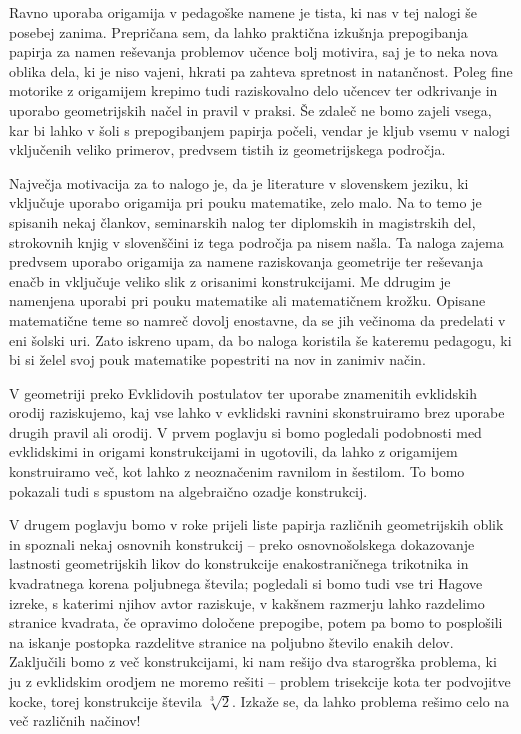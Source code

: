 Ravno uporaba origamija v pedagoške namene je tista, ki nas v tej nalogi še posebej zanima. Prepričana sem, da lahko praktična izkušnja prepogibanja papirja za namen reševanja problemov učence bolj motivira, saj je to neka nova oblika dela, ki je niso vajeni, hkrati pa zahteva spretnost in natančnost. Poleg fine motorike z origamijem krepimo tudi raziskovalno delo učencev ter odkrivanje in uporabo geometrijskih načel in pravil v praksi. Še zdaleč ne bomo zajeli vsega, kar bi lahko v šoli s prepogibanjem papirja počeli, vendar je kljub vsemu v nalogi vključenih veliko primerov, predvsem tistih iz geometrijskega področja.

Največja motivacija za to nalogo je, da je literature v slovenskem jeziku, ki vključuje uporabo origamija pri pouku matematike, zelo malo. Na to temo je spisanih nekaj člankov, seminarskih nalog ter diplomskih in magistrskih del, strokovnih knjig v slovenščini iz tega področja pa nisem našla. Ta naloga zajema predvsem uporabo origamija za namene raziskovanja geometrije ter reševanja enačb in vključuje veliko slik z orisanimi konstrukcijami. Me ddrugim je namenjena uporabi pri pouku matematike ali matematičnem krožku. Opisane matematične teme so namreč dovolj enostavne, da se jih večinoma da predelati v eni šolski uri. Zato iskreno upam, da bo naloga koristila še kateremu pedagogu, ki bi si želel svoj pouk matematike popestriti na nov in zanimiv način.

V geometriji preko Evklidovih postulatov ter uporabe znamenitih evklidskih orodij raziskujemo, kaj vse lahko v evklidski ravnini skonstruiramo brez uporabe drugih pravil ali orodij. V prvem poglavju si bomo pogledali podobnosti med evklidskimi in origami konstrukcijami in ugotovili, da lahko z origamijem konstruiramo več, kot lahko z neoznačenim ravnilom in šestilom. To bomo pokazali tudi s spustom na algebraično ozadje konstrukcij.

V drugem poglavju bomo v roke prijeli liste papirja različnih geometrijskih oblik in spoznali nekaj osnovnih konstrukcij -- preko osnovnošolskega dokazovanje lastnosti geometrijskih likov do konstrukcije enakostraničnega trikotnika in kvadratnega korena poljubnega števila; pogledali si bomo tudi vse tri Hagove izreke, s katerimi njihov avtor raziskuje, v kakšnem razmerju lahko razdelimo stranice kvadrata, če opravimo določene prepogibe, potem pa bomo to posplošili na iskanje postopka razdelitve stranice na poljubno število enakih delov. Zaključili bomo z več konstrukcijami, ki nam rešijo dva starogrška problema, ki ju z evklidskim orodjem ne moremo rešiti -- problem trisekcije kota ter podvojitve kocke, torej konstrukcije števila $\sqrt[3]{2}$. Izkaže se, da lahko problema rešimo celo na več različnih načinov!

